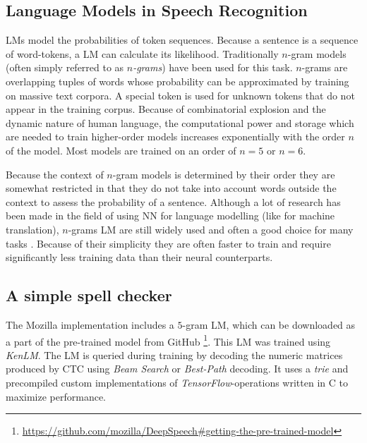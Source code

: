 \subsection{Language Models in Speech Recognition}

\ac{LM}s model the probabilities of token sequences. Because a sentence is a sequence of word-tokens, a \ac{LM} can calculate its likelihood. Traditionally $n$-gram models (often simply referred to as \textit{$n$-grams}) have been used for this task. $n$-grams are overlapping tuples of words whose probability can be approximated by training on massive text corpora. A special token  is used for unknown tokens that do not appear in the training corpus. Because of combinatorial explosion and the dynamic nature of human language, the computational power and storage which are needed to train higher-order models increases exponentially with the order $n$ of the model. Most models are trained on an order of $n=5$ or $n=6$. 

Because the context of $n$-gram models is determined by their order they are somewhat restricted in that they do not take into account words outside the context to assess the probability of a sentence. Although a lot of research has been made in the field of using \ac{NN} for language modelling (like for machine translation), $n$-grams \ac{LM} are still widely used and often a good choice for many tasks \parencite{slp3}. Because of their simplicity they are often faster to train and require significantly less training data than their neural counterparts.

\subsection{A simple spell checker}

The Mozilla implementation includes a $5$-gram \ac{LM}, which can be downloaded as a part of the pre-trained model from GitHub \footnote{\url{https://github.com/mozilla/DeepSpeech\#getting-the-pre-trained-model}}. This \ac{LM} was trained using \textit{KenLM}. The \ac{LM} is queried during training by decoding the numeric matrices produced by \ac{CTC} using \textit{Beam Search} or \textit{Best-Path} decoding. It uses a \textit{trie} and precompiled custom implementations of \textit{TensorFlow}-operations written in C  to maximize performance. 

